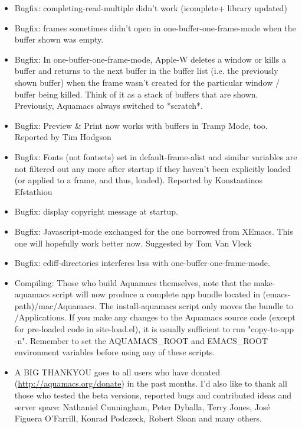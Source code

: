 \begin{itemize}
\item  Bugfix: completing-read-multiple didn't work (icomplete+ library
        updated)

\item  Bugfix: frames sometimes didn't open in
        one-buffer-one-frame-mode when the buffer shown was empty.

\item  Bugfix: In one-buffer-one-frame-mode, Apple-W deletes a window
        or kills a buffer and returns to the next buffer in the buffer
        list (i.e. the previously shown buffer) when the frame wasn't
        created for the particular window / buffer being killed. Think of
        it as a stack of buffers that are shown. Previously, Aquamacs
        always switched to *scratch*.

\item  Bugfix: Preview \& Print now works with buffers in Tramp Mode, too.
        Reported by Tim Hodgson

\item  Bugfix: Fonts (not fontsets) set in default-frame-alist and
        similar variables are not filtered out any more after startup if
        they haven't been explicitly loaded (or applied to a frame, and
        thus, loaded).
        Reported by Konstantinos Efstathiou

\item  Bugfix: display copyright message at startup.

\item  Bugfix: Javascript-mode exchanged for the one borrowed from
        XEmacs. This one will hopefully work better now.
        Suggested by Tom Van Vleck

\item  Bugfix: ediff-directories interferes less with one-buffer-one-frame-mode.

\item  Compiling: Those who build Aquamacs themselves, note that the
        make-aquamacs script will now produce a complete app bundle
        located in (emacs-path)/mac/Aquamacs. The install-aquamacs script
        only moves the bundle to /Applications. If you make any changes to
        the Aquamacs source code (except for pre-loaded code in
        site-load.el), it is usually sufficient to run
        "copy-to-app -n". Remember to set the AQUAMACS\_ROOT and EMACS\_ROOT
        environment variables before using any of these scripts.

      \item A BIG THANKYOU goes to all users who have donated
        (\url{http://aquamacs.org/donate}) in the past months. I'd
        also like to thank all those who tested the beta versions,
        reported bugs and contributed ideas and server space:
        Nathaniel Cunningham, Peter Dyballa, Terry Jones, José Figuera
        O'Farrill, Konrad Podczeck, Robert Sloan and many others.

\end{itemize}

